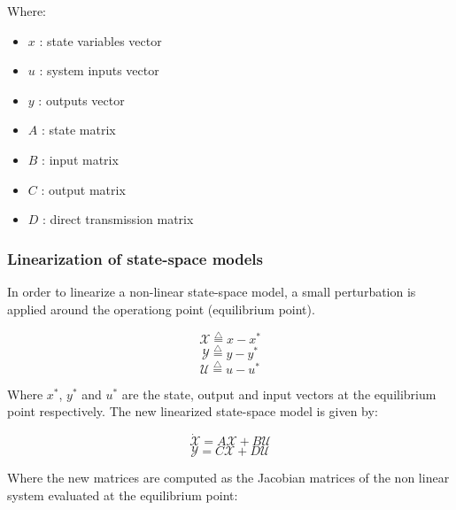 Where:

\begin{itemize}
  \item $x$ : state variables vector
  \item $u$ : system inputs vector
  \item $y$ : outputs vector
  \item $A$ : state matrix
  \item $B$ : input matrix
  \item $C$ : output matrix
  \item $D$ : direct transmission matrix
\end{itemize}

\subsubsection{Linearization of state-space models}

In order to linearize a non-linear state-space model, a small perturbation is applied around the operationg point (equilibrium point).

\begin{equation}
   \mathcal{X} \overset{\triangle}{=} x-x^*
\end{equation}
\begin{equation}
   \mathcal{Y} \overset{\triangle}{=} y-y^*
\end{equation}
\begin{equation}
   \mathcal{U} \overset{\triangle}{=} u-u^*
\end{equation}

Where $x^*$, $y^*$ and $u^*$ are the state, output and input vectors at the equilibrium point respectively. The new linearized state-space model is given by:

\vspace{2cm}

\begin{equation}
 \dot{\mathcal{X}} = A \mathcal{X} + B \mathcal{U}
\end{equation}
\begin{equation}
\mathcal{Y} = C \mathcal{X} + D \mathcal{U}
\end{equation}

Where the new matrices are computed as the Jacobian matrices of the non linear system evaluated at the equilibrium point:

